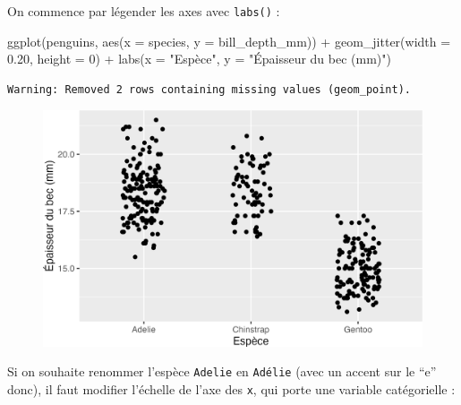 \documentclass[
  letterpaper,
  DIV=11,
  numbers=noendperiod]{scrreprt}
\newenvironment{Shaded}{\begin{snugshade}}{\end{snugshade}}
\newcommand{\AttributeTok}[1]{\textcolor[rgb]{0.40,0.45,0.13}{#1}}
\newcommand{\DecValTok}[1]{\textcolor[rgb]{0.68,0.00,0.00}{#1}}
\newcommand{\FloatTok}[1]{\textcolor[rgb]{0.68,0.00,0.00}{#1}}
\newcommand{\FunctionTok}[1]{\textcolor[rgb]{0.28,0.35,0.67}{#1}}
\newcommand{\NormalTok}[1]{\textcolor[rgb]{0.00,0.23,0.31}{#1}}
\newcommand{\SpecialCharTok}[1]{\textcolor[rgb]{0.37,0.37,0.37}{#1}}
\newcommand{\StringTok}[1]{\textcolor[rgb]{0.13,0.47,0.30}{#1}}
\begin{document}
On commence par légender les axes avec \texttt{labs()} :

\begin{Shaded}
\begin{Highlighting}[]
\FunctionTok{ggplot}\NormalTok{(penguins, }\FunctionTok{aes}\NormalTok{(}\AttributeTok{x =}\NormalTok{ species, }\AttributeTok{y =}\NormalTok{ bill\_depth\_mm)) }\SpecialCharTok{+}
  \FunctionTok{geom\_jitter}\NormalTok{(}\AttributeTok{width =} \FloatTok{0.20}\NormalTok{, }\AttributeTok{height =} \DecValTok{0}\NormalTok{) }\SpecialCharTok{+}
  \FunctionTok{labs}\NormalTok{(}\AttributeTok{x =} \StringTok{"Espèce"}\NormalTok{, }\AttributeTok{y =} \StringTok{"Épaisseur du bec (mm)"}\NormalTok{)}
\end{Highlighting}
\end{Shaded}

\begin{verbatim}
Warning: Removed 2 rows containing missing values (geom_point).
\end{verbatim}

\begin{figure}[H]

{\centering \includegraphics{./03-visualization_files/figure-pdf/unnamed-chunk-104-1.png}

}

\end{figure}

Si on souhaite renommer l'espèce \texttt{Adelie} en \texttt{Adélie}
(avec un accent sur le ``e'' donc), il faut modifier l'échelle de l'axe
des \texttt{x}, qui porte une variable catégorielle :
\end{document}
